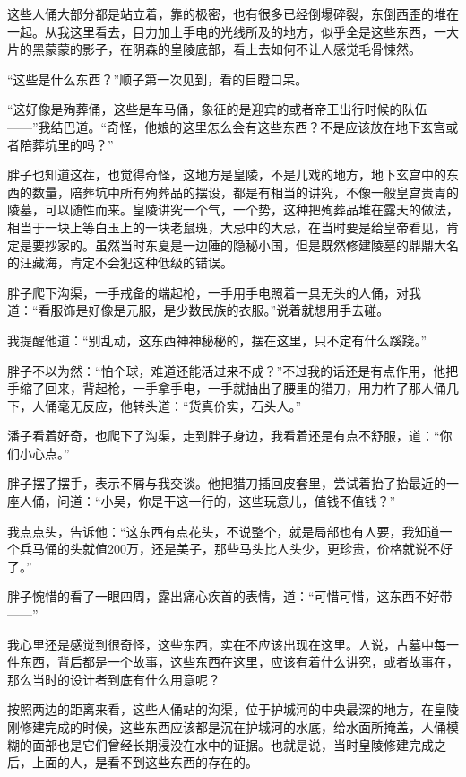 这些人俑大部分都是站立着，靠的极密，也有很多已经倒塌碎裂，东倒西歪的堆在一起。从我这里看去，目力加上手电的光线所及的地方，似乎全是这些东西，一大片的黑蒙蒙的影子，在阴森的皇陵底部，看上去如何不让人感觉毛骨悚然。

“这些是什么东西？”顺子第一次见到，看的目瞪口呆。

“这好像是殉葬俑，这些是车马俑，象征的是迎宾的或者帝王出行时候的队伍——”我结巴道。“奇怪，他娘的这里怎么会有这些东西？不是应该放在地下玄宫或者陪葬坑里的吗？”

胖子也知道这茬，也觉得奇怪，这地方是皇陵，不是儿戏的地方，地下玄宫中的东西的数量，陪葬坑中所有殉葬品的摆设，都是有相当的讲究，不像一般皇宫贵胄的陵墓，可以随性而来。皇陵讲究一个气，一个势，这种把殉葬品堆在露天的做法，相当于一块上等白玉上的一块老鼠斑，大忌中的大忌，在当时要是给皇帝看见，肯定是要抄家的。虽然当时东夏是一边陲的隐秘小国，但是既然修建陵墓的鼎鼎大名的汪藏海，肯定不会犯这种低级的错误。

胖子爬下沟渠，一手戒备的端起枪，一手用手电照着一具无头的人俑，对我道：“看服饰是好像是元服，是少数民族的衣服。”说着就想用手去碰。

我提醒他道：“别乱动，这东西神神秘秘的，摆在这里，只不定有什么蹊跷。”

胖子不以为然：“怕个球，难道还能活过来不成？”不过我的话还是有点作用，他把手缩了回来，背起枪，一手拿手电，一手就抽出了腰里的猎刀，用力杵了那人俑几下，人俑毫无反应，他转头道：“货真价实，石头人。”

潘子看着好奇，也爬下了沟渠，走到胖子身边，我看着还是有点不舒服，道：“你们小心点。”

胖子摆了摆手，表示不屑与我交谈。他把猎刀插回皮套里，尝试着抬了抬最近的一座人俑，问道：“小吴，你是干这一行的，这些玩意儿，值钱不值钱？”

我点点头，告诉他：“这东西有点花头，不说整个，就是局部也有人要，我知道一个兵马俑的头就值200万，还是美子，那些马头比人头少，更珍贵，价格就说不好了。”

胖子惋惜的看了一眼四周，露出痛心疾首的表情，道：“可惜可惜，这东西不好带——”

我心里还是感觉到很奇怪，这些东西，实在不应该出现在这里。人说，古墓中每一件东西，背后都是一个故事，这些东西在这里，应该有着什么讲究，或者故事在，那么当时的设计者到底有什么用意呢？

按照两边的距离来看，这些人俑站的沟渠，位于护城河的中央最深的地方，在皇陵刚修建完成的时候，这些东西应该都是沉在护城河的水底，给水面所掩盖，人俑模糊的面部也是它们曾经长期浸没在水中的证据。也就是说，当时皇陵修建完成之后，上面的人，是看不到这些东西的存在的。

